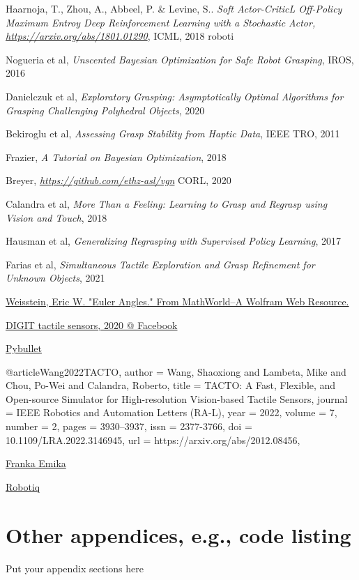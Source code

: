 \documentclass[11pt, a4paper]{report}
\theoremstyle{definition}
\begin{document}
\begin{thebibliography}{9}
    Haarnoja, T., Zhou, A., Abbeel, P. & Levine, S..
    \textit{Soft Actor-CriticL Off-Policy Maximum Entroy Deep Reinforcement Learning with a Stochastic Actor, \href{https://arxiv.org/abs/1801.01290}{https://arxiv.org/abs/1801.01290}},
    ICML,
    2018 roboti

    Nogueria et al,
    \textit{Unscented Bayesian Optimization for Safe Robot Grasping},
    IROS,
    2016

    Danielczuk et al,
    \textit{Exploratory Grasping: Asymptotically Optimal Algorithms for Grasping Challenging Polyhedral Objects},
    2020

    Bekiroglu et al,
    \textit{Assessing Grasp Stability from Haptic Data},
    IEEE TRO,
    2011

    Frazier,
    \textit{A Tutorial on Bayesian Optimization},
    2018

    Breyer,
    \textit{\href{https://github.com/ethz-asl/vgn}{https://github.com/ethz-asl/vgn}}
    CORL,
    2020

    Calandra et al,
    \textit{More Than a Feeling: Learning to Grasp and Regrasp using Vision and Touch},
    2018

    Hausman et al,
    \textit{Generalizing Regrasping with Supervised Policy Learning},
    2017

    Farias et al,
    \textit{Simultaneous Tactile Exploration and Grasp Refinement for Unknown Objects},
    2021

    \href{https://mathworld.wolfram.com/EulerAngles.html}{Weisstein, Eric W. "Euler Angles." From MathWorld--A Wolfram Web Resource.}

    \href{https://digit.ml/}{DIGIT tactile sensors, 2020 @ Facebook}

    \href{https://pybullet.org/wordpress/}{Pybullet}

@article{Wang2022TACTO,
  author   = {Wang, Shaoxiong and Lambeta, Mike and Chou, Po-Wei and Calandra, Roberto},
  title    = {{TACTO}: A Fast, Flexible, and Open-source Simulator for High-resolution Vision-based Tactile Sensors},
  journal  = {IEEE Robotics and Automation Letters (RA-L)},
  year     = {2022},
  volume   = {7},
  number   = {2},
  pages    = {3930--3937},
  issn     = {2377-3766},
  doi      = {10.1109/LRA.2022.3146945},
  url      = {https://arxiv.org/abs/2012.08456},
}

    \href{https://www.franka.de}{Franka Emika}

    \href{https://robotiq.com/products/2f85-140-adaptive-robot-gripper}{Robotiq}

\end{thebibliography}

\chapter{Other appendices, e.g., code listing}
Put your appendix sections here
\end{document}
